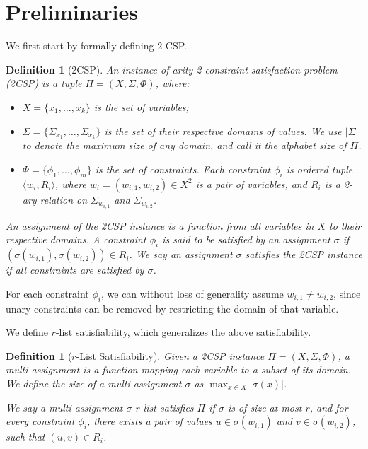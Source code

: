\documentclass[10pt,a4paper]{article}
\newtheorem{definition}[theorem]{Definition}
\begin{document}
\section{Preliminaries}
\label{sec:pre}
We first start by formally defining $2$-CSP.
\begin{definition}[2CSP]\label{def:2csp}
An instance of arity-2 constraint satisfaction problem (2CSP) is a tuple $\Pi=(X,\Sigma,\Phi)$, where:
\begin{itemize}
\item $X=\{x_1,\ldots,x_k\}$ is the set of variables;
\item $\Sigma=\{\Sigma_{x_1},\ldots,\Sigma_{x_k}\}$ is the set of their respective domains of values. We use $|\Sigma|$ to denote the maximum size of any domain, and call it the alphabet size of $\Pi$. 
\item $\Phi=\{\phi_1,\ldots,\phi_m\}$ is the set of constraints. Each constraint $\phi_i$ is 
 ordered tuple $\langle w_i,R_i\rangle$, where $w_i=(w_{i,1},w_{i,2}) \in X^2$ is a pair of variables, and $R_i$ is a 2-ary relation on $\Sigma_{w_{i,1}}$ and $\Sigma_{w_{i,2}}$. 
\end{itemize}

An assignment of the 2CSP instance is a function from all variables in $X$ to their respective domains. A constraint $\phi_i$ is said to be satisfied by an assignment $\sigma$ if $(\sigma(w_{i,1}),\sigma(w_{i,2}))\in R_i$. We say an assignment $\sigma$ satisfies the 2CSP instance if all constraints are satisfied by $\sigma$. 
\end{definition}

For each constraint $\phi_i$, we can without loss of generality assume $w_{i,1} \neq w_{i,2}$, since unary constraints can be removed by restricting the domain of that variable.

We define $r$-list satisfiability, which generalizes the above satisfiability. 
\begin{definition}[$r$-List Satisfiability]
    Given a 2CSP instance $\Pi=(X,\Sigma,\Phi)$, a multi-assignment is a function mapping each variable to a subset of its domain. We define the size of a multi-assignment $\sigma$ as $\max_{x \in X} |\sigma(x)|$.
    
    We say a multi-assignment $\sigma$ $r$-list satisfies $\Pi$ if $\sigma$ is of size at most $r$, and for every constraint $\phi_i$, there exists a pair of values $u \in \sigma(w_{i,1})$ and $v \in \sigma(w_{i,2})$, such that $(u,v) \in R_i$.
\end{definition}
\end{document}
